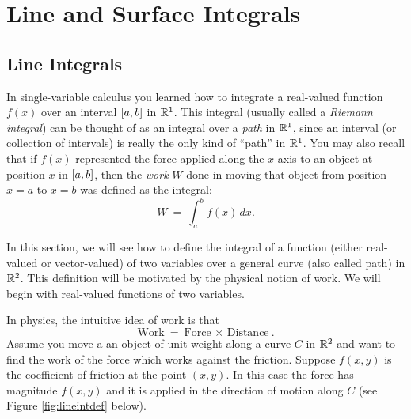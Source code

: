 \chapter{Line and Surface Integrals}
\label{chapter:surface-integrals}
\section{Line Integrals}
In single-variable calculus you learned how to integrate a real-valued function $f(x)$ over an interval $\lbrack a,b \rbrack$ in $\mathbb{R}^{1}$. 
This integral (usually called a \emph{Riemann integral})
can be thought of as an integral over a \emph{path} in $\mathbb{R}^{1}$, since an interval
(or collection of intervals) is really the only kind of ``path'' in $\mathbb{R}^{1}$. 
You may also recall that if $f(x)$
represented the force applied along the $x$-axis to an object at position $x$ in $\lbrack a,b \rbrack$, then the \emph{work}
$W$ done in moving that object from position $x=a$ to $x=b$ was defined as the integral:
\begin{displaymath}
W ~=~ \int_a^b f(x)\,dx.
\end{displaymath}

In this section, we will see how to define the integral of a function (either real-valued or vector-valued) of
two variables over a general curve (also called path) in $\mathbb{R}^{2}$. 
This definition will be motivated by the physical notion of work. We will begin with real-valued functions of
two variables.

In physics, the intuitive idea of work is that
\begin{displaymath}
 \text{Work} ~=~ \text{Force}\,\times\,\text{Distance} ~.
\end{displaymath}
Assume you move a an object of unit weight along a curve $C$ in
$\mathbb{R}^{2}$ 
and want to find the work of the force which works against the friction.
Suppose $f(x,y)$ is the coefficient of friction at the point $(x,y)$.
In this case the force has magnitude $f(x,y)$ and it is applied in the direction of motion along $C$ (see Figure \ref{fig:lineintdef} below).

